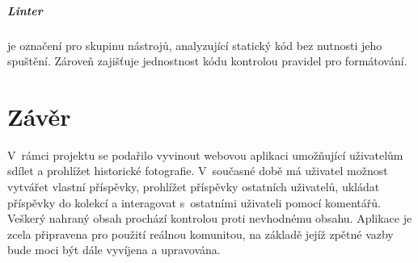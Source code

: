 \documentclass[12pt, a4paper,
  oneside,      %
]{report}
\begin{document}
\paragraph{Linter} je označení pro skupinu nástrojů, analyzující statický kód bez nutnosti jeho spuštění. Zároveň zajišťuje jednostnost kódu kontrolou pravidel pro formátování.


\chapter{Závěr}
V~rámci projektu se podařilo vyvinout webovou aplikaci umožňující uživatelům sdílet a prohlížet historické fotografie. V~současné době má uživatel možnost vytvářet vlastní příspěvky, prohlížet příspěvky ostatních uživatelů, ukládat příspěvky do kolekcí a interagovat s~ostatními uživateli pomocí komentářů. Veškerý nahraný obsah prochází kontrolou proti nevhodnému obsahu. Aplikace je zcela připravena pro použití reálnou komunitou, na základě jejíž zpětné vazby bude moci být dále vyvíjena a upravována.

\listoffigures


\end{document}
